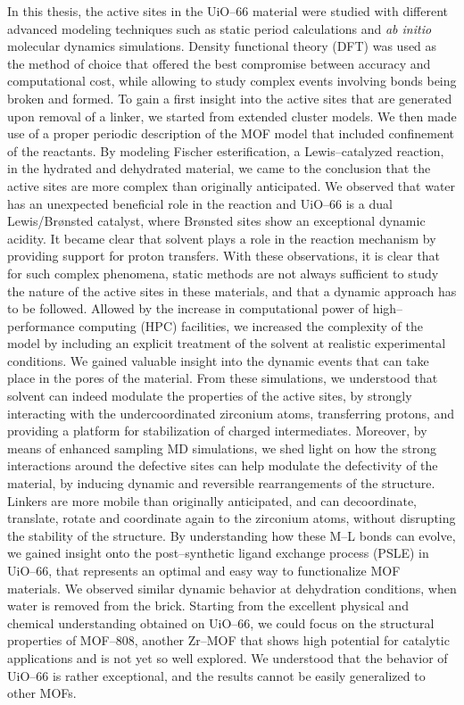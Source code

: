 \npar
In this thesis, the active sites in the UiO--66 material were studied with different advanced modeling techniques such as static period calculations and \textit{ab initio} molecular dynamics simulations. Density functional theory (DFT) was used as the method of choice that offered the best compromise between accuracy and computational cost, while allowing to study complex events involving bonds being broken and formed. To gain a first insight into the active sites that are generated upon removal of a linker, we started from extended cluster models. We then made use of a proper periodic description of the MOF model that included confinement of the reactants. By modeling Fischer esterification, a Lewis--catalyzed reaction, in the hydrated and dehydrated material, we came to the conclusion that the active sites are more complex than originally anticipated. We observed that water has an unexpected beneficial role in the reaction and UiO--66 is a dual Lewis/Br\o{}nsted catalyst, where Br\o{}nsted sites show an exceptional dynamic acidity. It became clear that solvent plays a role in the reaction mechanism by providing support for proton transfers.
\npar
With these observations, it is clear that for such complex phenomena, static methods are not always sufficient to study the nature of the active sites in these materials, and that a dynamic approach has to be followed. Allowed by the increase in computational power of high--performance computing (HPC) facilities, we increased the complexity of the model by including an explicit treatment of the solvent at realistic experimental conditions. We gained valuable insight into the dynamic events that can take place in the pores of the material. From these simulations, we understood that solvent can indeed modulate the properties of the active sites, by strongly interacting with the undercoordinated zirconium atoms, transferring protons, and providing a platform for stabilization of charged intermediates. Moreover, by means of enhanced sampling MD simulations, we shed light on how the strong interactions around the defective sites can help modulate the defectivity of the material, by inducing dynamic and reversible rearrangements of the structure. Linkers are more mobile than originally anticipated, and can decoordinate, translate, rotate and coordinate again to the zirconium atoms, without disrupting the stability of the structure. By understanding how these M--L bonds can evolve, we gained insight onto the post--synthetic ligand exchange process (PSLE) in UiO--66, that represents an optimal and easy way to functionalize MOF materials. We observed similar dynamic behavior at dehydration conditions, when water is removed from the brick. Starting from the excellent physical and chemical understanding obtained on UiO--66, we could focus on the structural properties of MOF--808, another Zr--MOF that shows high potential for catalytic applications and is not yet so well explored. We understood that the behavior of UiO--66 is rather exceptional, and the results cannot be easily generalized to other MOFs.
